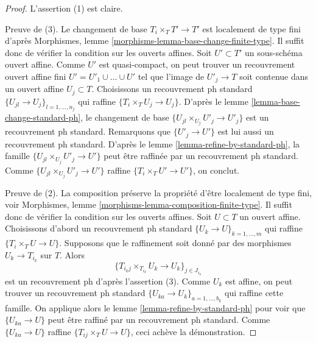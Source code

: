 \begin{proof}
L'assertion (1) est claire.

\medskip\noindent
Preuve de (3). Le changement de base $T_i \times_T T' \to T'$ est
localement de type fini d'après
Morphismes, lemme \ref{morphisms-lemma-base-change-finite-type}.
Il suffit donc de vérifier la condition sur les ouverts affines.
Soit $U' \subset T'$ un sous-schéma ouvert affine.
Comme $U'$ est quasi-compact, on peut trouver un recouvrement ouvert
affine fini $U' = U'_1 \cup \ldots \cup U'$ tel que
l'image de $U'_j \to T$ soit contenue dans un ouvert affine $U_j \subset T$.
Choisissons un recouvrement ph standard $\{U_{jl} \to U_j\}_{l = 1, \ldots, n_j}$
qui raffine $\{T_i \times_T U_j \to U_j\}$.
D'après le lemme \ref{lemma-base-change-standard-ph},
le changement de base $\{U_{jl} \times_{U_j} U'_j \to U'_j\}$
est un recouvrement ph standard. Remarquons que $\{U'_j \to U'\}$
est lui aussi un recouvrement ph standard.
D'après le lemme \ref{lemma-refine-by-standard-ph},
la famille $\{U_{jl} \times_{U_j} U'_j \to U'\}$
peut être raffinée par un recouvrement ph standard. Comme
$\{U_{jl} \times_{U_j} U'_j \to U'\}$ raffine $\{T_i \times_T U' \to U'\}$,
on conclut.

\medskip\noindent
Preuve de (2). La composition préserve la propriété d'être localement de type fini,
voir Morphismes, lemme \ref{morphisms-lemma-composition-finite-type}.
Il suffit donc de vérifier la condition sur les ouverts affines.
Soit $U \subset T$ un ouvert affine. Choisissons d'abord un recouvrement ph standard
$\{U_k \to U\}_{k = 1, \ldots, m}$ qui raffine
$\{T_i \times_T U \to U\}$.
Supposons que le raffinement soit donné par des morphismes $U_k \to T_{i_k}$ sur $T$.
Alors
$$
\{T_{i_kj} \times_{T_{i_k}} U_k \to U_k\}_{j \in J_{i_k}}
$$
est un recouvrement ph d'après l'assertion (3). Comme $U_k$ est affine,
on peut trouver un recouvrement ph standard
$\{U_{ka} \to U_k\}_{a = 1, \ldots, b_k}$ qui raffine cette famille.
On applique alors le lemme \ref{lemma-refine-by-standard-ph}
pour voir que $\{U_{ka} \to U\}$ peut être raffiné par un
recouvrement ph standard. Comme $\{U_{ka} \to U\}$
raffine $\{T_{ij} \times_T U \to U\}$, ceci achève la démonstration.
\end{proof}

